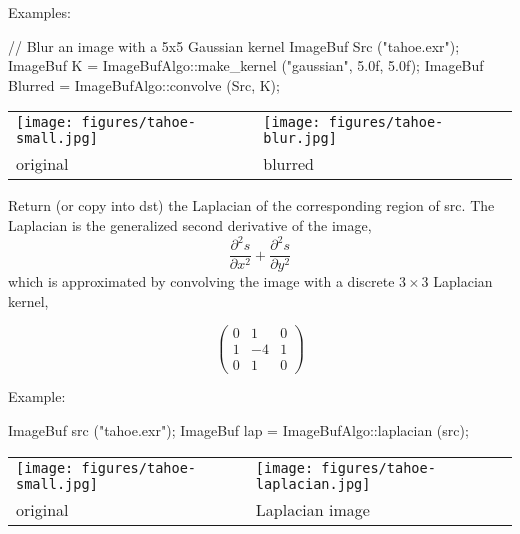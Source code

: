 \smallskip
\noindent Examples:
\begin{code}
    // Blur an image with a 5x5 Gaussian kernel
    ImageBuf Src ("tahoe.exr");
    ImageBuf K = ImageBufAlgo::make_kernel ("gaussian", 5.0f, 5.0f);
    ImageBuf Blurred = ImageBufAlgo::convolve (Src, K);
\end{code}

\spc \begin{tabular}{lll}
\texttt{[image: figures/tahoe-small.jpg]} &
\texttt{[image: figures/tahoe-blur.jpg]} \\
original & blurred \\
\end{tabular}
\apiend


 
Return (or copy into {\cf dst}) the Laplacian of the corresponding
region of {\cf src}. The Laplacian is the generalized second derivative
of the image,
$$\frac{\partial^2 s}{\partial x^2} + \frac{\partial^2 s}{\partial y^2}$$
which is approximated by convolving the image with a discrete $3 \times 3$
Laplacian kernel,

\[ \left( \begin{array}{ccc}
0 &  1 & 0 \\
1 & -4 & 1 \\
0 &  1 & 0 \end{array} \right)\]

\smallskip
\noindent Example:
\begin{code}
    ImageBuf src ("tahoe.exr");
    ImageBuf lap = ImageBufAlgo::laplacian (src);
\end{code}

\spc \begin{tabular}{ll}
\texttt{[image: figures/tahoe-small.jpg]} &
\texttt{[image: figures/tahoe-laplacian.jpg]} \\
original & Laplacian image \\
\end{tabular}
\apiend


 
 

